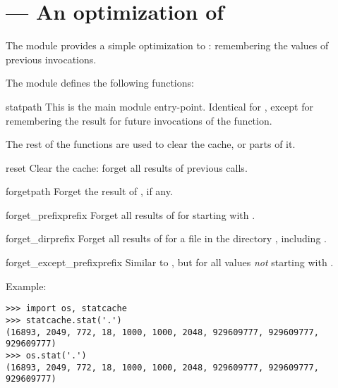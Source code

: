\section{ ---
         An optimization of }




The  module provides a simple optimization to
: remembering the values of previous invocations.

The  module defines the following functions:

\begin{funcdesc}{stat}{path}
This is the main module entry-point.
Identical for , except for remembering the result
for future invocations of the function.
\end{funcdesc}

The rest of the functions are used to clear the cache, or parts of
it.

\begin{funcdesc}{reset}{}
Clear the cache: forget all results of previous 
calls.
\end{funcdesc}

\begin{funcdesc}{forget}{path}
Forget the result of , if any.
\end{funcdesc}

\begin{funcdesc}{forget_prefix}{prefix}
Forget all results of  for  starting
with .
\end{funcdesc}

\begin{funcdesc}{forget_dir}{prefix}
Forget all results of  for  a file in 
the directory , including .
\end{funcdesc}

\begin{funcdesc}{forget_except_prefix}{prefix}
Similar to , but for all  values
\emph{not} starting with .
\end{funcdesc}

Example:

\begin{verbatim}
>>> import os, statcache
>>> statcache.stat('.')
(16893, 2049, 772, 18, 1000, 1000, 2048, 929609777, 929609777, 929609777)
>>> os.stat('.')
(16893, 2049, 772, 18, 1000, 1000, 2048, 929609777, 929609777, 929609777)
\end{verbatim}
